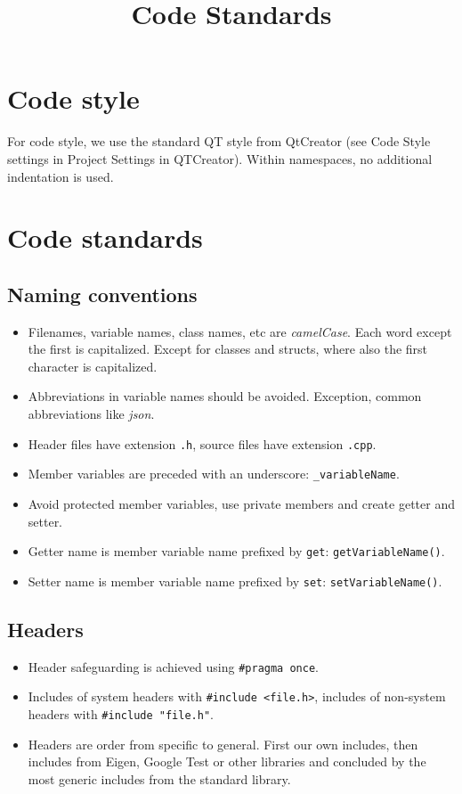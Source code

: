 \documentclass{article}
\title{Code Standards}
\begin{document}
\maketitle

\section{Code style}
For code style, we use the standard QT style from QtCreator (see Code Style settings in Project Settings in QTCreator). Within namespaces, no additional indentation is used.

\section{Code standards}

\subsection{Naming conventions}
\begin{itemize}
 \item Filenames, variable names, class names, etc  are \textit{camelCase}. Each word except the first is capitalized. Except for classes and structs, where also the first character is capitalized.
 \item Abbreviations in variable names should be avoided. Exception, common abbreviations like \textit{json}.
 \item Header files have extension \verb|.h|, source files have extension \verb|.cpp|.
 \item Member variables are preceded with an underscore: \verb|_variableName|.
 \item Avoid protected member variables, use private members and create getter and setter.
 \item Getter name is member variable name prefixed by \verb|get|: \verb|getVariableName()|.
 \item Setter name is member variable name prefixed by \verb|set|: \verb|setVariableName()|.
\end{itemize}

\subsection{Headers}
\begin{itemize}
 \item Header safeguarding is achieved using \verb|#pragma once|.
 \item Includes of system headers with \verb|#include <file.h>|, includes of non-system headers with \verb|#include "file.h"|.
 \item Headers are order from specific to general. First our own includes, then includes from Eigen, Google Test or other libraries and concluded by the most generic includes from the standard library.
\end{itemize}
\end{document}
